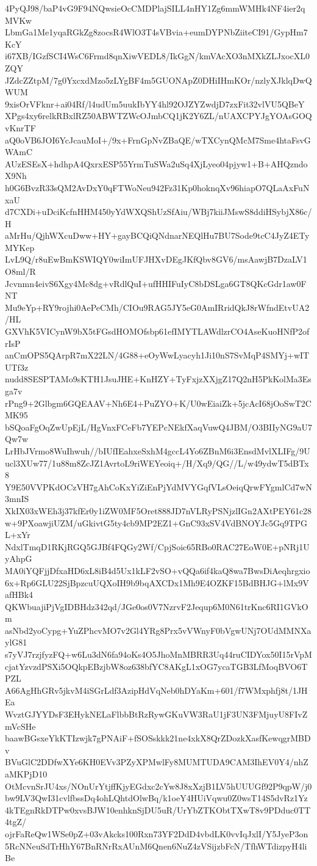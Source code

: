 4PyQJ98/baP4vG9F94NQwsieOcCMDPlajSILL4nHY1Zg6mmWMHk4NF4ier2qMVKw
LbmGa1Me1yqaRGkZg8zocsR4WlO3T4sVBvia+eumDYPNbZiiteCI91/GypHm7KcY
i67XB/IGzfSCI4WsC6Frmd8qnXiwVEDL8/IkGgN/kmVAcXO3nMXkZLJxocXL0ZQY
JZdcZZtpM/7g0YxcxdMzo5zLYgBF4m5GUONApZ0DHiIHmKOr/nzlyXJklqDwQWUM
9xisOrVFknr+ai04Rf/l4udUm5uukIbYY4hl92OJZYZwdjD7zxFit32vlVU5QBeY
XPgs4xy6relkRBxlRZ50ABWTZWcOJmbCQ1jK2Y6ZL/nUAXCPYJgYOAsGOQvKnrTF
aQ0oVB6JOI6YcJcauMoI+/9x+FrnGpNvZBaQE/wTXCynQMcM7Sme4htaFsvGWAmC
AUzESEsX+hdhpA4QxrxESP55YrmTuSWa2uSq4XjLyeo04pjyw1+B+AHQzndoX9Nh
h0G6BvzR33sQM2AvDxY0qFTWoNeu942Fz31Kp0hoknqXv96hiapO7QLaAxFuNxaU
d7CXDi+uDciKcfnHHM450yYdWXQShUzSfAiu/WBj7kiiJMswS8ddiHSybjX86c/H
aMrHu/QjhWXcuDww+HY+gayBCQiQNdnarNEQlHu7BU7Sode9tcC4JyZ4ETyMYKep
LvL9Q/r8uEwBmKSWIQY0wiImUFJHXvDEgJKfQbv8GV6/msAawjB7DzaLV1O8ml/R
Jcvnmn4eivS6Xgy4Mc8dg+vRdlQuI+ufHHIFuIyC8bDSLga6GT8QKcGdr1aw0FNT
Mu9eYp+RY9rojhi0AePeCMh/CIOu9RAG5JY5eG0AmIRridQkJ8rWfndEtvUA2/HL
GXVhK5VICynW9bX5tFGsdHOMOfsbp61efIMYTLAWdlzrCO4AseKuoHNfP2ofrIsP
anCmOPS5QArpR7mX22LN/4G88+eOyWwLyacyh1Ji10nS7SvMqP4SMYj+wITUTf3z
nudd8SESPTAMo9sKTH1JsuJHE+KnHZY+TyFxjzXXjgZ17Q2nH5PkKolMa3Esga7v
rPng9+2Glbgm6GQEAAV+Nh6E4+PuZYO+K/U0wEiaiZk+5jcAcI68jOoSwT2CMK95
bSQoaFgOqZwUpEjL/HgVnxFCeFb7YEPcNEkfXaqVuwQ4JBM/O3BIIyNG9aU7Qw7w
LrHbJVrmo8WuIhwuh//bIUfIEahxeSxhM4gccL4Yo6ZBnM6i3EnsdMvlXLIFg/9U
ucl3XUw77/1u88m8ZcJZ1AvrtoL9riWEYeoiq+/H/Xq9/QG//L/w49ydwT5dBTx8
Y9E50VVPKdOCzVH7gAhCoKxYiZiEnPjYdMVYGqfVLsOeiqQrwFYgmlCd7wN3mnIS
XkIX03xWEh3j37kfEr0y1iZW0MF5Oret888JD7nVLRyPSNjzlIGn2AXtPEY61c28
w+9PXoawjiUZM/uGkivtG5ty4cb9MP2EZ1+GnC93xSV4VdBNOYJc5Gq9TPGL+xYr
NdxlTmqD1RKjRGQ5GJBf4FQGy2Wf/CpjSoic65RBo0RAC27EoW0E+pNRj1UyAhpG
MA0iYQFjjDfxaHD6xL8iB4d5Ux1kLF2vSO+vQQa6if4kaQ8wa7BwsDiAeqhrgxio
6x+Rp6GLU22SjBpzcuUQXoIH9b9bqAXCDx1Mh9E4OZKF15BdBHJG+lMx9VafHBk4
QKWbuajiPjVgIDBHdz342qd/JGe0os0V7NzrvF2Jequp6M0N61trKnc6RI1GVkOm
asNbd2yoCypg+YuZPhcvMO7v2Gl4YRg8Prx5vVWnyF0bVgwUNj7OUdMMNXaylG81
s7yVJ7rzjfyzFQ+w6Lu3dN6fa94oKs4O5JhoMnMBRR3Uq44ruCIDYox50I15rVpM
cjatYzvzdPSXi5OQkpEBzjbW8oz638bfYC8AKgL1xOG7ycaTGB3LfMoqBVO6TPZL
A66AgHhGRv5jkvM4iSGrLdf3AzipHdVqNeb0hDYaKm+601/f7WMxphfj8t/1JHEa
WvztGJYYDsF3EHykNELaFlbbBtRzRywGKuVW3RaU1jF3UN3FMjuyU8FIvZmVcSHe
baawBGsxeYkKTIzwjk7gPNAiF+fSOSskkk21ne4xkX8QrZDozkXasfKewqgrMBDv
BVuGlC2DDfwXYe6KH0EVv3PZyXPMwlFy8MUMTUDA9CAM3IhEV0Y4/nhZaMKPjD10
OtMcvnSrJU4xs/NOnUrYtjffKjyEGdxc2cYw8J8xXzjB1LV5hUUUGf92P9qpW/j0
bw9LV3QwI31cvlfbssDq4ohLQhtdOlwBq/k1oeY4HUiVqwu0Z0wsT14S5dvRz1Yz
4kTEgnRkDTPw0xvsBJW10enhknSjDU5uR/UrYbZTKObtTXwT8v9PDduc0TT4tgZ/
ojrFaReQw1WSe0pZ+03vAkcks100Rxn73YF2DdD4vbdLK0vvIqJxlI/Y5JyeP3on
5RcNNeuSdTrHhY67BnRNrRxAUnM6Qnen6NuZ4zVSijzbFcN/TfhWTdizpyH4liBe
